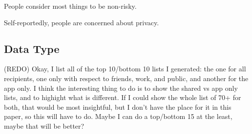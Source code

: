 \documentclass{acm_proc_article-sp}
\begin{document}
People consider most things to be non-risky. 

Self-reportedly, people are concerned about privacy. 

\subsection{Data Type}
(REDO) Okay, I list all of the top 10/bottom 10 lists I generated: the one for all recipients, one only with respect to friends, work, and public, and another for the app only. I think the interesting thing to do is to show the shared vs app only lists, and to highight what is different. If I could show the whole list of 70+ for both, that would be most insightful, but I don't have the place for it in this paper, so this will have to do. Maybe I can do a top/bottom 15 at the least, maybe that will be better? 


%
\end{document}
